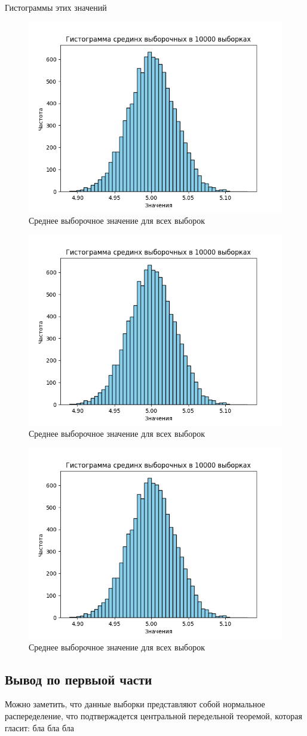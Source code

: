 \documentclass{article}
\begin{document}
Гистограммы этих значений
\begin{center}
      \begin{figure}
            \centering
            \includegraphics[width=0.5\linewidth]{Python/hist-mean.png}
            \caption{Среднее выборочное значение для всех выборок}
      \end{figure}
      \begin{figure}
            \centering
            \includegraphics[width=0.5\linewidth]{Python/hist-mean.png}
            \caption{Среднее выборочное значение для всех выборок}
      \end{figure}
      \begin{figure}
            \centering
            \includegraphics[width=0.5\linewidth]{Python/hist-mean.png}
            \caption{Среднее выборочное значение для всех выборок}
      \end{figure}
\end{center}

\subsection{Вывод по первыой части}
Можно заметить, что данные выборки представляют собой нормальное распеределение, что подтвержадется центральной передельной теоремой, которая гласит: бла бла бла
\end{document}

